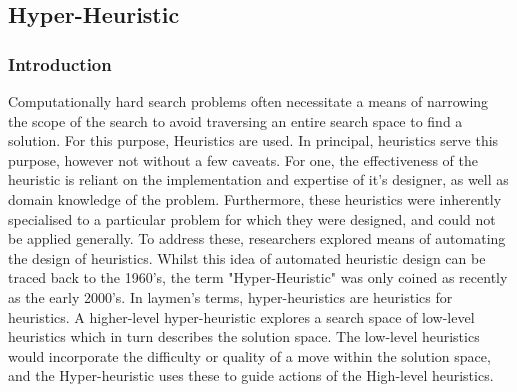 \documentclass[a4paper,12pt]{article}
\begin{document}
    \subsection{Hyper-Heuristic}  
        \subsubsection{Introduction}
            \par{Computationally hard search problems often necessitate a means of narrowing the scope of the search to avoid traversing an entire search space to find a solution. For this purpose, Heuristics are used. In principal, heuristics serve this purpose, however not without a few caveats. For one, the effectiveness of the heuristic is reliant on the implementation and expertise of it's designer, as well as domain knowledge of the problem. Furthermore, these heuristics were inherently specialised to a particular problem for which they were designed, and could not be applied generally\cite{hyperheuristictas}.  To address these, researchers explored means of automating the design of heuristics. Whilst this idea of automated heuristic design can be traced back to the 1960's, the term "Hyper-Heuristic" was only coined as recently as the early 2000's\cite{hyperheuristic2000}. In laymen's terms, hyper-heuristics are heuristics for heuristics. A higher-level hyper-heuristic explores a search space of low-level heuristics which in turn describes the solution space\cite{hhcds}. The low-level heuristics would incorporate the difficulty or quality of a move within the solution space, and the Hyper-heuristic uses these to guide actions of the High-level heuristics.}
\end{document}
